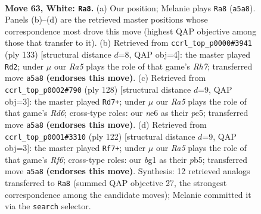 \documentclass[11pt]{article}
\begin{document}
\clearpage

\begin{figure}[p]\centering
\begin{subfigure}{0.46\textwidth}\centering
\resizebox{\linewidth}{!}{%
\newchessgame
\chessboard[
  setfen={8/8/3Nn1k1/R7/P7/7r/2K5/6b1 w - - 0 63},
  showmover=false,
  pgfstyle=straightmove, color=movearrow, markmove={a5-a8}
]}
\caption{}
\end{subfigure}\hfill
\begin{subfigure}{0.46\textwidth}\centering
\resizebox{\linewidth}{!}{%
\newchessgame
\chessboard[
  setfen={8/6k1/R7/8/8/5B1p/7r/5K2 b - - 1 67},
  showmover=false,
  pgfstyle=straightmove, color=movearrow, markmove={h2-d2}
]}
\caption{}
\end{subfigure}
\\[4pt]
\begin{subfigure}{0.46\textwidth}\centering
\resizebox{\linewidth}{!}{%
\newchessgame
\chessboard[
  setfen={8/5k2/3R4/1K1Pp3/8/2r5/8/8 w - - 1 65},
  showmover=false,
  pgfstyle=straightmove, color=movearrow, markmove={d6-d7}
]}
\caption{}
\end{subfigure}\hfill
\begin{subfigure}{0.46\textwidth}\centering
\resizebox{\linewidth}{!}{%
\newchessgame
\chessboard[
  setfen={8/3k4/5R2/1p3P2/8/8/5K2/2r5 w - - 7 62},
  showmover=false,
  pgfstyle=straightmove, color=movearrow, markmove={f6-f7}
]}
\caption{}
\end{subfigure}
\caption{\textbf{Move 63, White: \texttt{Ra8}.} (a) Our position; Melanie plays \texttt{Ra8} (\texttt{a5a8}). Panels (b)--(d) are the retrieved master positions whose correspondence most drove this move (highest QAP objective among those that transfer to it). (b) Retrieved from \texttt{ccrl\_top\_p0000\#3941} (ply 133) [structural distance $d$=8, QAP obj=4]: the master played \texttt{Rd2}; under $\mu$ our \emph{Ra5} plays the role of that game's \emph{Rh7}; transferred move \texttt{a5a8} \textbf{(endorses this move)}. (c) Retrieved from \texttt{ccrl\_top\_p0002\#790} (ply 128) [structural distance $d$=9, QAP obj=3]: the master played \texttt{Rd7+}; under $\mu$ our \emph{Ra5} plays the role of that game's \emph{Rd6}; cross-type roles: our \emph{n}e6 as their \emph{p}e5; transferred move \texttt{a5a8} \textbf{(endorses this move)}. (d) Retrieved from \texttt{ccrl\_top\_p0001\#3310} (ply 122) [structural distance $d$=9, QAP obj=3]: the master played \texttt{Rf7+}; under $\mu$ our \emph{Ra5} plays the role of that game's \emph{Rf6}; cross-type roles: our \emph{b}g1 as their \emph{p}b5; transferred move \texttt{a5a8} \textbf{(endorses this move)}. Synthesis: 12 retrieved analogs transferred to \texttt{Ra8} (summed QAP objective 27, the strongest correspondence among the candidate moves); Melanie committed it via the \texttt{search} selector.}
\label{fig:thought-m124}
\end{figure}
\end{document}
